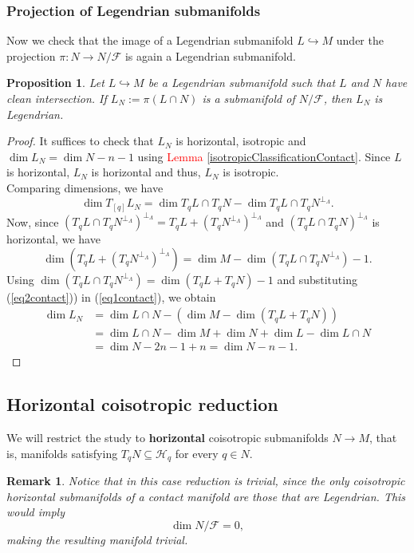 \documentclass[12pt]{article}
\newtheorem{prop}{Proposition}[section]
\newtheorem{remark}{Remark}[section]
\renewcommand{\dim}{\operatorname{dim}}
\begin{document}
\subsubsection{Projection of Legendrian submanifolds}
Now we check that the image of a Legendrian submanifold $L \hookrightarrow M$ under the projection $\pi: N \rightarrow N/\mathcal{F}$ is again a Legendrian submanifold.\\

\begin{prop} \label{ProjectionLegendrianVerticalContact}Let $L \hookrightarrow M$ be a Legendrian submanifold such that $L$ and $N$ have clean intersection. If $ L_N:=  \pi(L \cap N)$ is a submanifold of $N/ \mathcal{F}$, then $L_N$ is Legendrian.
\end{prop}
\begin{proof} It suffices to check that $L_N$ is horizontal, isotropic and $\dim L_N = \dim N - n - 1$ using \textcolor{red}{Lemma \ref{isotropicClassificationContact}}.  Since $L$ is horizontal, $L_N$ is horizontal and thus, $L_N$ is isotropic.\\

Comparing dimensions, we have
\begin{equation}\label{eq1contact}
\dim T_{[q]}L_N = \dim T_qL\cap T_qN - \dim T_qL \cap T_qN^{\perp_\Lambda}.
\end{equation}
Now, since $(T_qL \cap T_qN^{\perp_\Lambda})^{\perp_\Lambda} = T_qL + (T_qN^{\perp_\Lambda})^{\perp_\Lambda}$ and $(T_qL \cap T_qN)^{\perp_\Lambda}$ is horizontal, we have 
\begin{equation}\label{eq2contact}
\dim( T_qL + (T_qN^{\perp_\Lambda})^{\perp_\Lambda}) = \dim M - \dim(T_qL \cap T_qN^{\perp_\Lambda}) - 1.
\end{equation}
Using $\dim(T_qL \cap T_qN^{\perp_\Lambda}) = \dim(T_qL + T_qN) - 1$ and substituting (\ref{eq2contact})) in (\ref{eq1contact}), we obtain
\begin{align*}
\dim L_N& = \dim L \cap N - \left( \dim M - \dim(T_qL + T_qN )\right) \\
&= \dim L \cap N - \dim M + \dim N + \dim L - \dim L \cap N \\
&= \dim N - 2n - 1 + n = \dim N - n -1.
\end{align*}
\end{proof}

\subsection{Horizontal coisotropic reduction}
We will restrict the study to \textbf{horizontal} coisotropic submanifolds $N \rightarrow M$, that is, manifolds satisfying $T_qN \subseteq \mathcal{H}_q$ for every $q\in N$. \\
\begin{remark}{\rm  Notice that in this case reduction is trivial, since the only coisotropic horizontal submanifolds of a contact manifold are those that are Legendrian. This would imply $$\dim N/\mathcal{F} = 0,$$ making the resulting manifold trivial.}
\end{remark}
\end{document}
